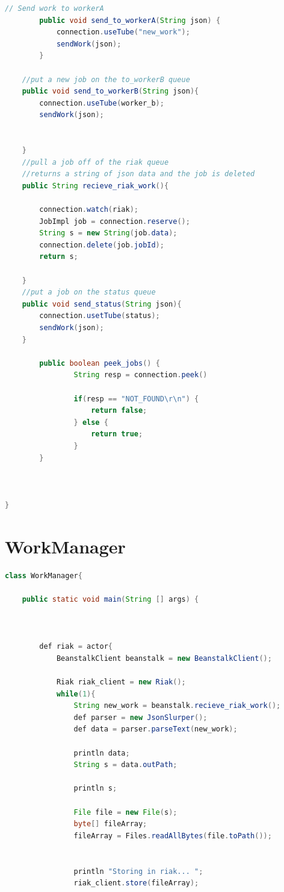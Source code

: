 \documentclass[onecolumn, draftclsnofoot,10pt, compsoc]{IEEEtran}
\begin{document}
\begin{appendices}
\begin{lstlisting}[language=java]
        // Send work to workerA
        public void send_to_workerA(String json) {
            connection.useTube("new_work");
            sendWork(json);
        }

	//put a new job on the to_workerB queue
	public void send_to_workerB(String json){
		connection.useTube(worker_b);
		sendWork(json);
		
		
	}
	//pull a job off of the riak queue
	//returns a string of json data and the job is deleted
	public String recieve_riak_work(){

		connection.watch(riak);
		JobImpl job = connection.reserve();
		String s = new String(job.data);
		connection.delete(job.jobId);
		return s;

	}
	//put a job on the status queue
	public void send_status(String json){
		connection.usetTube(status);
		sendWork(json);
	}

        public boolean peek_jobs() {
                String resp = connection.peek()

                if(resp == "NOT_FOUND\r\n") {
                    return false;
                } else {
                    return true;
                }
        }



}

\end{lstlisting}

\clearpage
\section{WorkManager}
\begin{lstlisting}[language = java]
class WorkManager{

	public static void main(String [] args) {



		def riak = actor{
			BeanstalkClient beanstalk = new BeanstalkClient();		

			Riak riak_client = new Riak();
			while(1){
				String new_work = beanstalk.recieve_riak_work();
				def parser = new JsonSlurper();
				def data = parser.parseText(new_work);

				println data;	
				String s = data.outPath;

				println s;

				File file = new File(s);
				byte[] fileArray;
				fileArray = Files.readAllBytes(file.toPath());


				println "Storing in riak... ";
				riak_client.store(fileArray);
				



\end{lstlisting}
\end{appendices}
\end{document}
